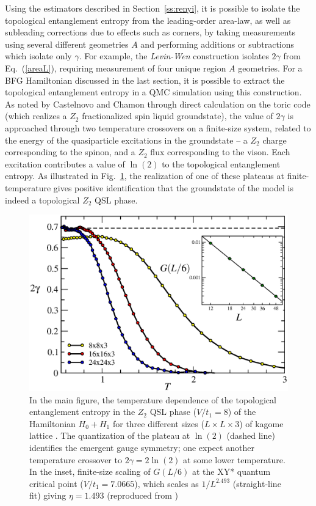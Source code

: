 \documentclass[range]{ar2e}
\begin{document}
Using the estimators described in Section~\ref{ss:renyi}, it is possible to isolate the topological entanglement entropy from the leading-order area-law, as well as subleading corrections due to effects such as corners, by taking measurements using several different geometries $A$ and performing additions or subtractions which isolate only $\gamma$.  For example, the {\it Levin-Wen} \cite{LW} construction isolates $2\gamma$ from Eq.~(\ref{areaL}), requiring measurement of four unique region $A$ geometries.  For a BFG Hamiltonian discussed in the last section, it is possible to extract the topological entanglement entropy in a QMC simulation using this construction.  As noted by Castelnovo and Chamon \cite{castelnovo} through direct calculation on the toric code (which realizes a $Z_2$ fractionalized spin liquid groundstate), the value of $2\gamma$ is approached through two temperature crossovers on a finite-size system, related to the energy of the quasiparticle excitations in the groundstate -- a $Z_2$ charge corresponding to the spinon, and a $Z_2$ flux corresponding to the vison.  Each excitation contributes a value of $\ln(2)$ to the topological entanglement entropy.  As illustrated in Fig.~\ref{QSLfig}, the realization of one of these plateaus at finite-temperature gives positive identification that the groundstate of the model is indeed a topological $Z_2$ QSL phase.

\begin{figure}
\centerline{\includegraphics[width=4.5in]{QSL}}
\caption{In the main figure, the temperature dependence of the topological entanglement entropy in the $Z_2$ QSL phase ($V/t_1 = 8$) of the Hamiltonian $H_0 + H_1$ for three different sizes ($L \times L \times 3$) of kagome lattice \cite{TopoEE}.  The quantization of the plateau at $\ln(2)$ (dashed line) identifies the emergent gauge symmetry; one expect another temperature crossover to $2 \gamma = 2 \ln(2)$ at some lower temperature.  In the inset, finite-size scaling of
$G(L/6)$ at the XY* quantum critical point ($V/t_1 = 7.0665$), which scales as  $1/L^{2.493}$ (straight-line fit) giving $\eta = 1.493$ (reproduced from \cite{XYstarQMC})
\label{QSLfig}}
\end{figure}
\end{document}
